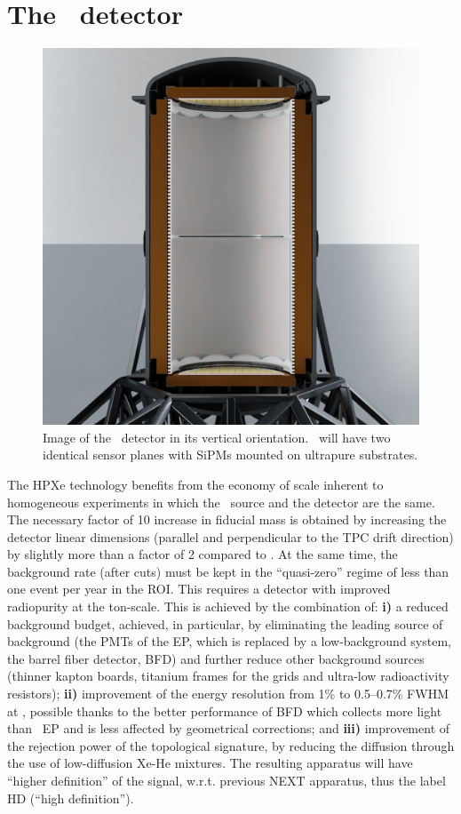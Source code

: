 \section{The \NHD\ detector}
\label{sec.hd}

\begin{figure}[htbp!]
\centering
    \includegraphics[width=0.82\linewidth]{img/cut_detector.png}
     \caption{\small Image of the \NHD\ detector in its vertical orientation. \NHD\ will have two identical sensor planes with SiPMs mounted on ultrapure substrates.}
     \label{fig.NHD}
\end{figure}


 The HPXe technology benefits from the economy of scale inherent to homogeneous experiments in which the \bbonu\ source and the detector are the same. The necessary factor of 10 increase in fiducial mass is obtained by increasing the detector linear dimensions (parallel and perpendicular to the TPC drift direction) by slightly more than a factor of 2 compared to \NEXT. At the same time, the background rate (after cuts) must be kept in the ``quasi-zero'' regime of less than one event per year in the ROI. This requires a detector with improved radiopurity at the ton-scale. This is achieved by the combination of: {\bf i)} a reduced background budget, achieved, in particular, by eliminating the leading source of background (the PMTs of the EP, which is replaced by a low-background system, the barrel fiber detector, BFD) and further reduce other background sources (thinner kapton boards, titanium frames for the grids and ultra-low radioactivity resistors);  {\bf ii)} improvement of the energy resolution from 1\% to 0.5--0.7\% FWHM at \Qbb, possible thanks to the better  performance of BFD which collects more light than \Next\ EP and is less affected by geometrical corrections; and {\bf iii)} improvement of the rejection power of the topological signature, by reducing the diffusion through the use of low-diffusion Xe-He mixtures. The resulting apparatus will have ``higher definition'' of the signal, w.r.t. previous NEXT apparatus, thus the label HD (``high definition''). 
  
